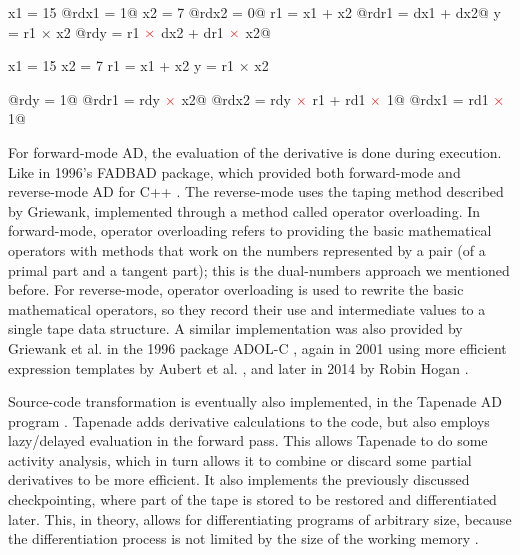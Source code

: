         \begin{quicklst}[caption={An example of input-agnostic forward mode AD by source transformation, with the AD statements in red}, label=lst:transformation_fw, gobble=12]
             x1 = 15
            @rdx1 = 1@
             x2 = 7
            @rdx2 = 0@
             r1 = x1 + x2
            @rdr1 = dx1 + dx2@
             y  = r1 $\times$ x2
            @rdy  = r1 $\color{red}\times$ dx2 + dr1 $\color{red}\times$ x2@
        \end{quicklst}

        \begin{quicklst}[caption={An example of input-agnostic reverse mode AD by source transformation, with the AD statements in red}, label=lst:transformation_rv, gobble=12]
             x1 = 15
             x2 = 7
             r1 = x1 + x2
             y  = r1 $\times$ x2

            @rdy  = 1@
            @rdr1 = rdy $\color{red}\times$ x2@
            @rdx2 = rdy $\color{red}\times$ r1 + rd1 $\color{red}\times$ 1@
            @rdx1 = rd1 $\color{red}\times$ 1@
        \end{quicklst}
        
        For forward-mode AD, the evaluation of the derivative is done during execution. Like in 1996's FADBAD package, which provided both forward-mode and reverse-mode AD for C++ \cite{bendtsen1996fadbad}.
        The reverse-mode uses the taping method described by Griewank, implemented through a method called operator overloading.
        In forward-mode, operator overloading refers to providing the basic mathematical operators with methods that work on the numbers represented by a pair (of a primal part and a tangent part); this is the dual-numbers approach we mentioned before.
        For reverse-mode, operator overloading is used to rewrite the basic mathematical operators, so they record their use and intermediate values to a single tape data structure.
        A similar implementation was also provided by Griewank et al. in the 1996 package ADOL-C \cite{griewank1996algorithm}, again in 2001 using more efficient expression templates by Aubert et al. \cite{aubert2001automatic}, and later in 2014 by Robin Hogan \cite{hogan2014fast}.

        Source-code transformation is eventually also implemented, in the Tapenade AD program \cite{hascoet2013tapenade}.
        Tapenade adds derivative calculations to the code, but also employs lazy/delayed evaluation in the forward pass.
        This allows Tapenade to do some activity analysis, which in turn allows it to combine or discard some partial derivatives to be more efficient.
        It also implements the previously discussed checkpointing, where part of the tape is stored to be restored and differentiated later.
        This, in theory, allows for differentiating programs of arbitrary size, because the differentiation process is not limited by the size of the working memory \cite{griewank2008evaluating}.

